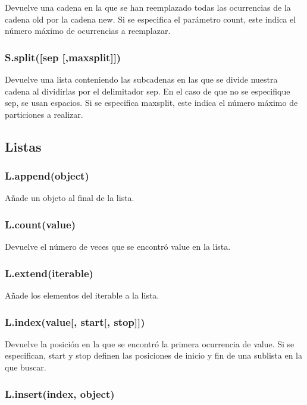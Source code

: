 \documentclass[12pt, twoside]{report}
\begin{document}
Devuelve una cadena en la que se han reemplazado todas las ocurrencias de la cadena old por la cadena new. Si se especifica el parámetro count, este indica el número máximo de ocurrencias a reemplazar.


\subsubsection{S.split([sep [,maxsplit]])}

Devuelve una lista conteniendo las subcadenas en las que se divide nuestra cadena al dividirlas por el delimitador sep. En el caso de que no se especifique sep, se usan espacios. Si se especifica maxsplit, este indica el número máximo de particiones a realizar.

\subsection{Listas}
\subsubsection{L.append(object)}

Añade un objeto al final de la lista.

\subsubsection{L.count(value)}

Devuelve el número de veces que se encontró value en la lista.

\subsubsection{L.extend(iterable)}

Añade los elementos del iterable a la lista.

\subsubsection{L.index(value[, start[, stop]])}

Devuelve la posición en la que se encontró la primera ocurrencia de value. Si se especifican, start y stop definen las posiciones de inicio y fin de una sublista en la que buscar.

\subsubsection{L.insert(index, object)}
\end{document}
